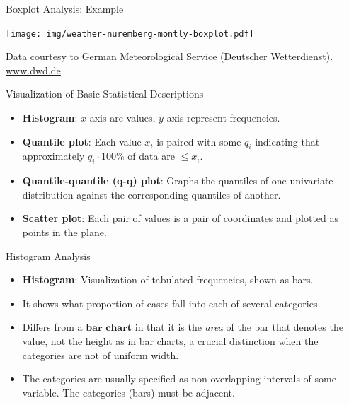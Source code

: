 \begin{frame}{Boxplot Analysis: Example}
  \vspace{-1em}
  \begin{center}
    \texttt{[image: img/weather-nuremberg-montly-boxplot.pdf]}
  \end{center}
  \vspace{-2em}
  {\tiny Data courtesy to German Meteorological Service (Deutscher Wetterdienst). \url{www.dwd.de}}
\end{frame}

\begin{frame}{Visualization of Basic Statistical Descriptions}
  \begin{itemize}
  \item \textbf{Histogram}: $x$-axis are values, $y$-axis represent frequencies.
  \item \textbf{Quantile plot}: Each value $x_i$ is paired with some $q_i$ indicating that approximately $q_i \cdot 100 \%$ of data are $\leq x_i$.
  \item \textbf{Quantile-quantile (q-q) plot}: Graphs the quantiles of one univariate distribution against the corresponding quantiles of another.
  \item \textbf{Scatter plot}: Each pair of values is a pair of coordinates and plotted as points in the plane.
  \end{itemize}
\end{frame}

\begin{frame}{Histogram Analysis}
  \begin{itemize}
  \item \textbf{Histogram}: Visualization of tabulated frequencies, shown as bars.
  \item It shows what proportion of cases fall into each of several categories.
  \item Differs from a $\textbf{bar chart}$ in that it is the \emph{area} of the bar that denotes the value, not the height as in bar charts, a crucial distinction when the categories are not of uniform width.
  \item The categories are usually specified as non-overlapping intervals of some variable. The categories (bars) must be adjacent.
  \end{itemize}\vspace{0.2cm}
  \centering
\end{frame}

